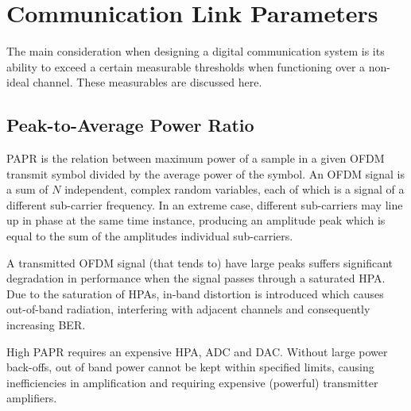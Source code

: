 
\section{Communication Link Parameters}
The main consideration when designing a digital communication system is its ability to exceed a certain measurable thresholds when functioning over a non-ideal channel\cite{hayk}. These measurables are discussed here.

\subsection{Peak-to-Average Power Ratio}
\gls{PAPR} is the relation between maximum power of a sample in a given \gls{OFDM} transmit symbol divided by the average power of the symbol\cite{french}. An OFDM signal is a sum of \(N\) independent, complex random variables, each of which is a signal of a different sub-carrier frequency. In an extreme case, different sub-carriers may line up in phase at the same time instance, producing an amplitude peak which is equal to the sum of the amplitudes individual sub-carriers.

A transmitted OFDM signal (that tends to) have large peaks suffers significant degradation in performance when the signal passes through a saturated \gls{HPA}. Due to the saturation of \gls{HPA}s, in-band distortion is introduced which causes out-of-band radiation, interfering with adjacent channels\cite{prob} and consequently increasing \gls{BER}.

High \gls{PAPR} requires an expensive \gls{HPA}, \gls{ADC} and \gls{DAC}. Without large power back-offs, out of band power cannot be kept within specified limits, causing inefficiencies in amplification and requiring expensive (powerful) transmitter amplifiers.

